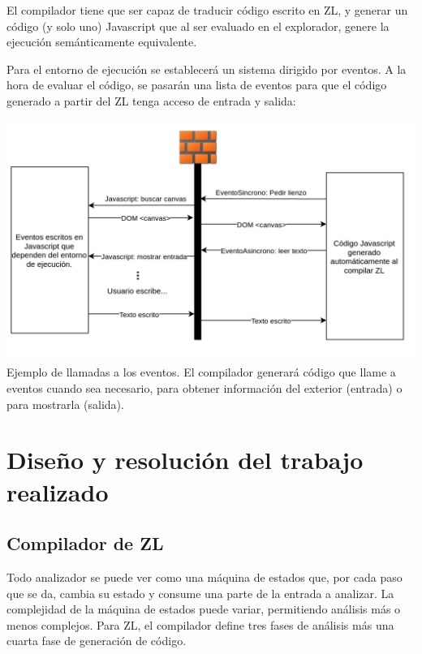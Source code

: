 \documentclass{report}
\begin{document}
	\vspace{10px}
	
	El compilador tiene que ser capaz de traducir código escrito en ZL, y generar un código (y solo uno) Javascript que al ser evaluado en el explorador, genere la ejecución semánticamente equivalente. 

	\vspace{10px}
	
	Para el entorno de ejecución se establecerá un sistema dirigido por eventos. A la hora de evaluar el código, se pasarán una lista de eventos para que el código generado a partir del ZL tenga acceso de entrada y salida:
	
	\begin{center}
	\includegraphics[width=1\linewidth]{diagramaeventos}
	Ejemplo de llamadas a los eventos. El compilador generará código que llame a eventos cuando sea necesario, para obtener información del exterior (entrada) o para mostrarla (salida).
	\end{center}


	\chapter{Diseño y resolución del trabajo realizado}
	
	\section{Compilador de ZL}
	
	Todo analizador se puede ver como una máquina de estados que, por cada paso que se da, cambia su estado y consume una parte de la entrada a analizar. La complejidad de la máquina de estados puede variar, permitiendo análisis más o menos complejos. Para ZL, el compilador define tres fases de análisis más una cuarta fase de generación de código.
		
\end{document}

